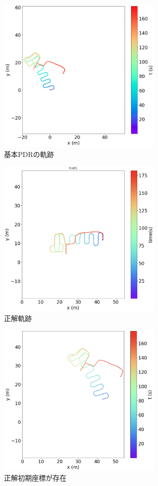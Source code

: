 \begin{figure}[ht]
	\centering
	\includegraphics[width=80mm]{image/pdr.jpg}
	\caption{基本PDRの軌跡}    \label{fig:pdr}
\end{figure}

\begin{figure}[ht]
	\centering
	\includegraphics[width=80mm]{image/gt2.jpg}
	\caption{正解軌跡}    \label{fig:gt-trajectory}
\end{figure}

\begin{figure}[ht]
	\centering
	\includegraphics[width=80mm]{image/pdr-move.jpg}
	\caption{正解初期座標が存在}    \label{fig:pdr-move}
\end{figure}



